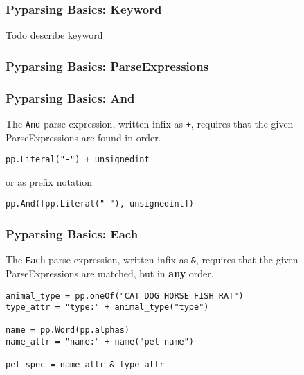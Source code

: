\documentclass{beamer}
\begin{document}
\begin{frame}
\frametitle{Pyparsing Basics: Keyword}
Todo describe keyword
\end{frame}



\begin{frame}
\frametitle{Pyparsing Basics: ParseExpressions}

\begin{center}
\end{center}

\end{frame}


\begin{frame}[fragile]
\frametitle{Pyparsing Basics: And}
The \texttt{And} parse expression, written infix as \texttt{+}, requires that the given ParseExpressions are found in order.

\begin{verbatim} 
pp.Literal("-") + unsignedint
\end{verbatim}

or as prefix notation
\begin{verbatim} 
pp.And([pp.Literal("-"), unsignedint])
\end{verbatim}

\end{frame}



\begin{frame}[fragile]
\frametitle{Pyparsing Basics: Each}
The \texttt{Each} parse expression, written infix as \texttt{\&}, requires that the given ParseExpressions are matched, but in \textbf{any} order.
\begin{verbatim}
animal_type = pp.oneOf("CAT DOG HORSE FISH RAT")
type_attr = "type:" + animal_type("type")

name = pp.Word(pp.alphas)
name_attr = "name:" + name("pet name")

pet_spec = name_attr & type_attr
\end{verbatim}
\end{frame}
\end{document}
